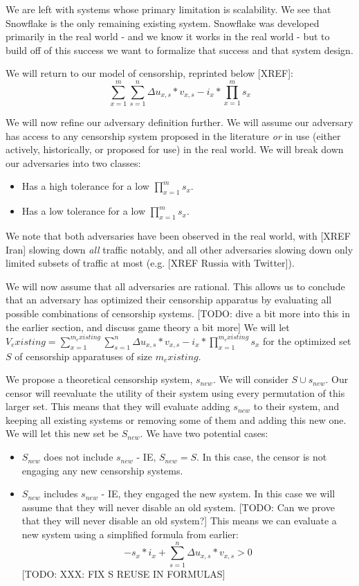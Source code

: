 \documentclass[12pt]{report}
\begin{document}
We are left with systems whose primary limitation is scalability. We see that Snowflake is the only remaining existing system. Snowflake was developed primarily in the real world - and we know it works in the real world - but to build off of this success we want to formalize that success and that system design.

We will return to our model of censorship, reprinted below [XREF]:
\begin{equation}
\sum_{x=1}^{m}\sum_{s=1}^{n}\Delta u_{x,s}*v_{x,s} - i_{x} * \prod_{x=1}^{m}s_x
\end{equation}

We will now refine our adversary definition further. We will assume our adversary has access to any censorship system proposed in the literature \emph{or} in use (either actively, historically, or proposed for use) in the real world. We will break down our adversaries into two classes:
\begin{itemize}
  \item Has a high tolerance for a low $\prod_{x=1}^{m}s_x$.
  \item Has a low tolerance for a low $\prod_{x=1}^{m}s_x$.
\end{itemize}
We note that both adversaries have been observed in the real world, with [XREF Iran] slowing down \emph{all} traffic notably, and all other adversaries slowing down only limited subsets of traffic at most (e.g. [XREF Russia with Twitter]).

We will now assume that all adversaries are rational. This allows us to conclude that an adversary has optimized their censorship apparatus by evaluating all possible combinations of censorship systems. [TODO: dive a bit more into this in the earlier section, and discuss game theory a bit more] We will let $V_existing = \sum_{x=1}^{m_existing}\sum_{s=1}^{n}\Delta u_{x,s}*v_{x,s} - i_{x} * \prod_{x=1}^{m_existing}s_x$ for the optimized set $S$ of censorship apparatuses of size $m_existing$.

We propose a theoretical censorship system, $s_{new}$. We will consider $S \cup {s_{new}}$. Our censor will reevaluate the utility of their system using every permutation of this larger set. This means that they will evaluate adding $s_{new}$ to their system, and keeping all existing systems or removing some of them and adding this new one. We will let this new set be $S_{new}$. We have two potential cases:
\begin{itemize}
  \item $S_{new}$ does not include $s_{new}$ - IE, $S_{new} = S$. In this case, the censor is not engaging any new censorship systems.
  \item $S_{new}$ includes $s_{new}$ - IE, they engaged the new system. In this case we will assume that they will never disable an old system. [TODO: Can we prove that they will never disable an old system?] This means we can evaluate a new system using a simplified formula from earlier:
  \begin{equation}
-s_x*i_x + \sum_{s=1}^{n}\Delta u_{x,s}*v_{x,s} > 0
  \end{equation}
  [TODO: XXX: FIX S REUSE IN FORMULAS]
\end{itemize}
\end{document}
